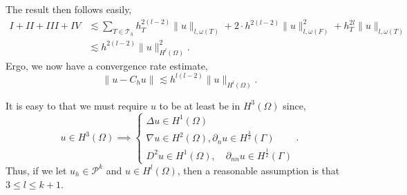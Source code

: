  The result then follows easily,
\[
    \begin{split}
        I + II + III +  IV  &  \lesssim  \sum_{T \in \mathcal{T} _{h}}^{}  h_{T}^{2\left( l-2 \right) } \| u \|_{l, \omega \left( T \right)   }^{  } +   2\cdot h^{2(l-2)}  \| u \|_{ l, \omega \left( F \right)  }^{ 2 } + h_{T}^{2l} \| u \|_{l, \omega \left( T \right)}
        \\
        &  \lesssim  h^{2\left( l-2 \right) } \| u \|_{ H^{l}\left( \Omega  \right)  }^{2  }.
    \end{split}
\]
Ergo, we now have a convergence rate estimate,
\[
\| u - C_{h}u \|_{  }^{  } \lesssim  h^{l(l-2)} \| u \|_{H^{l} \left( \Omega  \right)  }^{  }.
\]



It is easy to that we must require $u$ to be at least be in $H^{3}\left( \Omega  \right) $ since,
\[
u \in H^3\left( \Omega  \right)  \implies \begin{cases}
    \Delta u \in  H^{1}\left( \Omega  \right ) \\
    \nabla u \in H^2\left( \Omega  \right), \partial _{n} u \in H^{\frac{3}{2}}\left( \Gamma  \right) \\
    D^2u \in H^{1} \left( \Omega  \right), \quad  \partial _{nn}u \in  H^{\frac{1}{2}}\left( \Gamma  \right)
\end{cases}.
\]
Thus, if we let $u_{h} \in \mathcal{P} ^{k}$ and $u \in  H^{l}\left( \Omega  \right) $, then a reasonable assumption is that $3 \le  l \le k+1$.
















